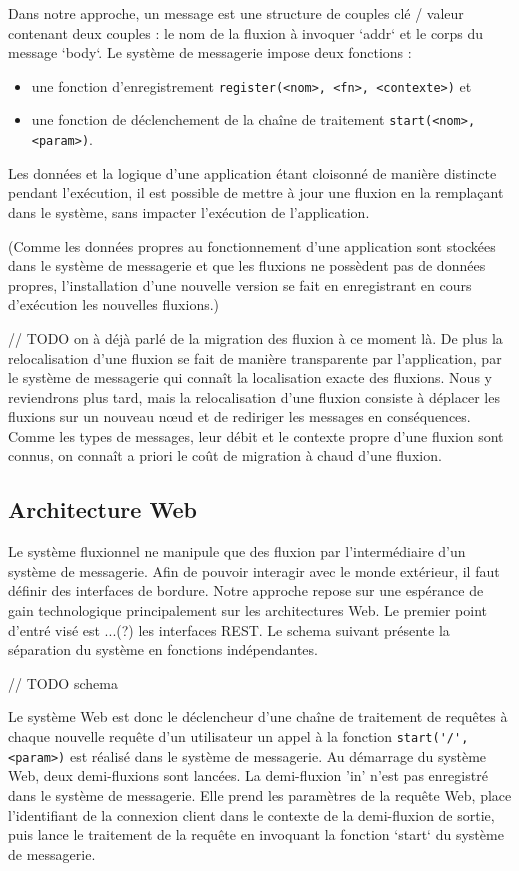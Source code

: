 		Dans notre approche, un message est une structure de couples clé / valeur  contenant deux couples : le nom de la fluxion à invoquer `addr` et le corps du message `body`.
		Le système de messagerie impose deux fonctions :
		\begin{itemize}
			\item une fonction d'enregistrement
		    \lstinline|register(<nom>, <fn>, <contexte>)| et
			\item une fonction de déclenchement de la chaîne de traitement
		    \lstinline|start(<nom>,<param>)|.
		\end{itemize}


		Les données et la logique d'une application étant cloisonné de manière distincte pendant l'exécution, il est possible de mettre à jour une fluxion en la remplaçant dans le système, sans impacter l'exécution de l'application.

		(Comme les données propres au fonctionnement d'une application sont stockées dans le système de messagerie et que les fluxions ne possèdent pas de données propres, l'installation d'une nouvelle version se fait en enregistrant en cours d'exécution les nouvelles fluxions.)


		// TODO on à déjà parlé de la migration des fluxion à ce moment là.
		De plus la relocalisation d'une fluxion se fait de manière transparente par l'application, par le système de messagerie qui connaît la localisation exacte des fluxions. Nous y reviendrons plus tard, mais la relocalisation d'une fluxion consiste à déplacer les fluxions sur un nouveau nœud et de rediriger les messages en conséquences. Comme les types de messages, leur débit et le contexte propre d'une fluxion sont connus, on connaît a priori le coût de migration à chaud d'une fluxion.

	\subsection{Architecture Web}

		Le système fluxionnel ne manipule que des fluxion par l'intermédiaire d'un système de messagerie. Afin de pouvoir interagir avec le monde extérieur, il faut définir des interfaces de bordure. Notre approche repose sur une espérance de gain technologique principalement sur les architectures Web. Le premier point d'entré visé est ...(?) les interfaces REST.
		Le schema suivant présente la séparation du système en fonctions indépendantes.

		// TODO schema

		Le système Web est donc le déclencheur d'une chaîne de traitement de requêtes à chaque nouvelle requête d'un utilisateur un appel à la fonction \lstinline|start('/', <param>)| est réalisé dans le système de messagerie.
		Au démarrage du système Web, deux demi-fluxions sont lancées.
		La demi-fluxion 'in' n'est pas enregistré dans le système de messagerie.
		Elle prend les paramètres de la requête Web, place l'identifiant de la connexion client dans le contexte de la demi-fluxion de sortie, puis lance le traitement de la requête en invoquant la fonction `start` du système de messagerie.

